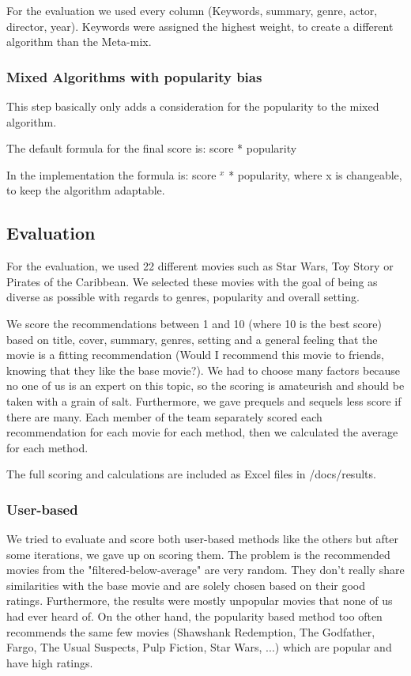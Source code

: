 \documentclass{article}
\begin{document}
For the evaluation we used every column (Keywords, summary, genre, actor, director, year). Keywords were assigned the highest weight, to create a different algorithm than the Meta-mix.
\subsubsection{Mixed Algorithms with popularity bias}
This step basically only adds a consideration for the popularity to the mixed algorithm.

The default formula for the final score is: score * popularity

In the implementation the formula is: score $^{x}$ * popularity,  where x is changeable, to keep the algorithm adaptable.
\subsection{Evaluation}
For the evaluation, we used 22 different movies such as Star Wars, Toy Story or Pirates of the Caribbean.
We selected these movies with the goal of being as diverse as possible with regards to genres, popularity and overall setting.

We score the recommendations between 1 and 10 (where 10 is the best score) based on title, cover, summary, genres, setting and a general feeling that the movie is a fitting recommendation (Would I recommend this movie to friends, knowing that they like the base movie?). We had to choose many factors because no one of us is an expert on this topic, so the scoring is amateurish and should be taken with a grain of salt. Furthermore, we gave prequels and sequels less score if there are many.
Each member of the team separately scored each recommendation for each movie for each method, then we calculated the average for each method.

The full scoring and calculations are included as Excel files in /docs/results.
\subsubsection{User-based}
We tried to evaluate and score both user-based methods like the others but after some iterations, we gave up on scoring them. The problem is the recommended movies from the "filtered-below-average" are very random. They don't really share similarities with the base movie and are solely chosen based on their good ratings. Furthermore, the results were mostly unpopular movies that none of us had ever heard of. On the other hand, the popularity based method too often recommends the same few movies (Shawshank Redemption, The Godfather, Fargo, The Usual Suspects, Pulp Fiction, Star Wars, ...) which are popular and have high ratings.
\end{document}
